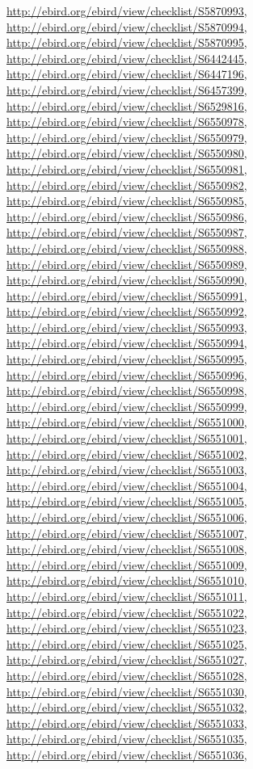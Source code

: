 \documentclass[9pt, article]{memoir}
\begin{document}
\begin{multicols}{2}
\url{http://ebird.org/ebird/view/checklist/S5870993}, 
\url{http://ebird.org/ebird/view/checklist/S5870994}, 
\url{http://ebird.org/ebird/view/checklist/S5870995}, 
\url{http://ebird.org/ebird/view/checklist/S6442445}, 
\url{http://ebird.org/ebird/view/checklist/S6447196}, 
\url{http://ebird.org/ebird/view/checklist/S6457399}, 
\url{http://ebird.org/ebird/view/checklist/S6529816}, 
\url{http://ebird.org/ebird/view/checklist/S6550978}, 
\url{http://ebird.org/ebird/view/checklist/S6550979}, 
\url{http://ebird.org/ebird/view/checklist/S6550980}, 
\url{http://ebird.org/ebird/view/checklist/S6550981}, 
\url{http://ebird.org/ebird/view/checklist/S6550982}, 
\url{http://ebird.org/ebird/view/checklist/S6550985}, 
\url{http://ebird.org/ebird/view/checklist/S6550986}, 
\url{http://ebird.org/ebird/view/checklist/S6550987}, 
\url{http://ebird.org/ebird/view/checklist/S6550988}, 
\url{http://ebird.org/ebird/view/checklist/S6550989}, 
\url{http://ebird.org/ebird/view/checklist/S6550990}, 
\url{http://ebird.org/ebird/view/checklist/S6550991}, 
\url{http://ebird.org/ebird/view/checklist/S6550992}, 
\url{http://ebird.org/ebird/view/checklist/S6550993}, 
\url{http://ebird.org/ebird/view/checklist/S6550994}, 
\url{http://ebird.org/ebird/view/checklist/S6550995}, 
\url{http://ebird.org/ebird/view/checklist/S6550996}, 
\url{http://ebird.org/ebird/view/checklist/S6550998}, 
\url{http://ebird.org/ebird/view/checklist/S6550999}, 
\url{http://ebird.org/ebird/view/checklist/S6551000}, 
\url{http://ebird.org/ebird/view/checklist/S6551001}, 
\url{http://ebird.org/ebird/view/checklist/S6551002}, 
\url{http://ebird.org/ebird/view/checklist/S6551003}, 
\url{http://ebird.org/ebird/view/checklist/S6551004}, 
\url{http://ebird.org/ebird/view/checklist/S6551005}, 
\url{http://ebird.org/ebird/view/checklist/S6551006}, 
\url{http://ebird.org/ebird/view/checklist/S6551007}, 
\url{http://ebird.org/ebird/view/checklist/S6551008}, 
\url{http://ebird.org/ebird/view/checklist/S6551009}, 
\url{http://ebird.org/ebird/view/checklist/S6551010}, 
\url{http://ebird.org/ebird/view/checklist/S6551011}, 
\url{http://ebird.org/ebird/view/checklist/S6551022}, 
\url{http://ebird.org/ebird/view/checklist/S6551023}, 
\url{http://ebird.org/ebird/view/checklist/S6551025}, 
\url{http://ebird.org/ebird/view/checklist/S6551027}, 
\url{http://ebird.org/ebird/view/checklist/S6551028}, 
\url{http://ebird.org/ebird/view/checklist/S6551030}, 
\url{http://ebird.org/ebird/view/checklist/S6551032}, 
\url{http://ebird.org/ebird/view/checklist/S6551033}, 
\url{http://ebird.org/ebird/view/checklist/S6551035}, 
\url{http://ebird.org/ebird/view/checklist/S6551036}, 

\end{multicols}
\end{document}
